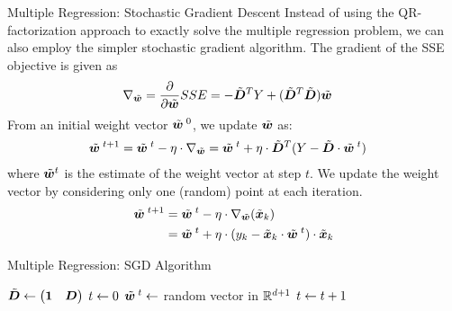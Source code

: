 \begin{frame}{Multiple Regression: Stochastic Gradient Descent}
Instead of using the QR-factorization approach to exactly solve the
multiple regression problem, we can also employ the simpler stochastic
gradient algorithm. 
The gradient of the SSE objective is given as
\begin{align*}
    \nabla_{\tilde{{\boldsymbol w}}} = 
    \frac{\partial}{\partial \tilde{{\boldsymbol w}}} SSE & = -\tilde{{\boldsymbol D}}^T Y + (\tilde{{\boldsymbol D}}^T\tilde{{\boldsymbol D}}) \tilde{{\boldsymbol w}}
\end{align*}
%
From an initial weight vector 
$\tilde{{\boldsymbol w}}^{\;0}$, we update $\tilde{{\boldsymbol w}}$ as:
\begin{align*}
    \tilde{{\boldsymbol w}}^{\;t+1}  &= \tilde{{\boldsymbol w}}^{\;t} - \eta \cdot \nabla_{\tilde{{\boldsymbol w}}}
    = \tilde{{\boldsymbol w}}^{\;t} + \eta \cdot \tilde{{\boldsymbol D}}^T(Y - \tilde{{\boldsymbol D}} \cdot \tilde{{\boldsymbol w}}^{\;t})
\end{align*}
where $\tilde{{\boldsymbol w}}^{t}$ is the estimate of the weight vector at step $t$.
%
We update the weight vector by
considering only one (random) point at each iteration. 
\begin{align*}
    \tilde{{\boldsymbol w}}^{\;t+1}  &= \tilde{{\boldsymbol w}}^{\;t} - \eta \cdot \nabla_{\tilde{{\boldsymbol w}}}(\tilde{{\boldsymbol x}}_k)\\
    & = \tilde{{\boldsymbol w}}^{\;t} + \eta \cdot (y_k - \tilde{{\boldsymbol x}}_k \cdot \tilde{{\boldsymbol w}}^{\;t}) \cdot
    \tilde{{\boldsymbol x}}_k
\end{align*}
\end{frame}
%
\begin{frame}{Multiple Regression: SGD Algorithm}
\begin{tightalgo}[H]{\textwidth-18pt}
\Algorithm{} 
$\tilde{{\boldsymbol D}} \leftarrow \bigl(\mathbf{1} \quad {\boldsymbol D}\bigr)$ \;
$t \leftarrow 0$ \; 
$\tilde{{\boldsymbol w}}^{\;t} \leftarrow $ random vector in ${\mathord{\mathbb R}}^{d+1}$ \;
{%
    $t \leftarrow t+1$\;
}%
\end{tightalgo}
\end{frame}
